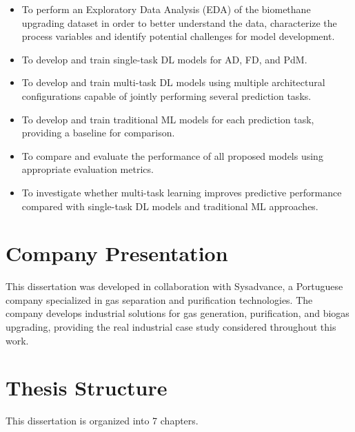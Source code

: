 \begin{itemize}
    \item To perform an Exploratory Data Analysis (EDA) of the biomethane upgrading dataset in order to better understand the data, characterize the process variables and identify potential challenges for model development.
    \item To develop and train single-task DL models for AD, FD, and PdM.
    \item To develop and train multi-task DL models using multiple architectural configurations capable of jointly performing several prediction tasks.
    \item To develop and train traditional ML models for each prediction task, providing a baseline for comparison.
    \item To compare and evaluate the performance of all proposed models using appropriate evaluation metrics.
    \item To investigate whether multi-task learning improves predictive performance compared with single-task DL models and traditional ML approaches.
\end{itemize}

\section{Company Presentation} \label{sec:company}

This dissertation was developed in collaboration with Sysadvance, a Portuguese company specialized in gas separation and purification technologies. The company 
develops industrial solutions for gas generation, purification, and biogas upgrading, providing the real industrial case study considered throughout this work.

\section{Thesis Structure} \label{sec:thesis}

This dissertation is organized into 7 chapters.

